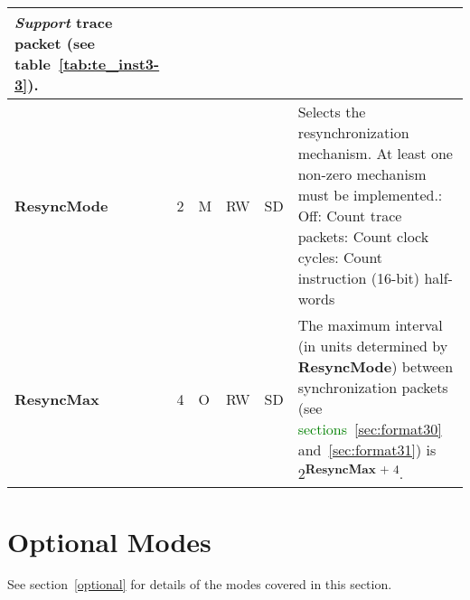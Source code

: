 \begin{table}[htp]
\begin{tabulary}{\textwidth}{|l|l|l|l|l|p{90mm}|}
      \textit{Support} trace packet (see table~\ref{tab:te_inst3-3}).\\
    \hline
    \textbf{ResyncMode} & 2 & M & RW & SD & Selects the resynchronization mechanism.  At least one non-zero mechanism must be implemented.: Off: Count trace packets: Count clock cycles: Count instruction (16-bit) half-words\\
    \hline
    \textbf{ResyncMax} & 4 & O & RW & SD & The maximum interval (in units determined by \textbf{ResyncMode}) between synchronization packets
    (see \textcolor{green}{sections}~\ref{sec:format30} and~\ref{sec:format31}) is 2\textsuperscript{\textbf{ResyncMax} + 4}.\\
    \hline
  \end{tabulary}
\end{table}

\FloatBarrier
\section{Optional Modes} \label{sec:ctl-modes}

See section~\ref{optional} for details of the modes covered in this section.

